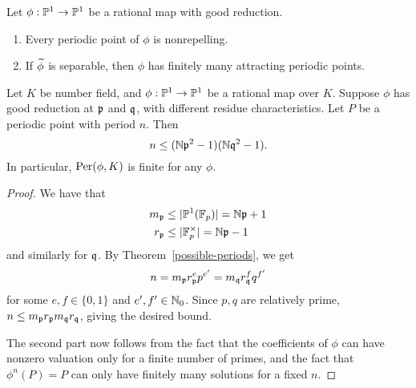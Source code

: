 \begin{cor}
Let $\phi:\mathbb{P}^1\to \mathbb{P}^1$ be a rational map with good reduction.
\begin{enumerate}
\item
Every periodic point of $\phi$ is nonrepelling.
\item
If $\widetilde{\phi}$ is separable, then $\phi$ has finitely many attracting periodic points.
\end{enumerate}
\end{cor}
\begin{thm}
Let $K$ be  number field, and $\phi:\mathbb{P}^1\to \mathbb{P}^1$ be a rational map over $K$. Suppose $\phi$ has good reduction at $\mathfrak{p}$ and $\mathfrak{q}$, with different residue characteristics. Let $P$ be a periodic point with period $n$. Then
\[
n\le (\mathbb{N}\mathfrak{p}^2-1)(\mathbb{N}\mathfrak{q}^2-1).
\]
In particular, $\operatorname{Per}(\phi,K)$ is finite for any $\phi$. %
\end{thm}
\begin{proof}
We have that 
\begin{align*}
m_{\mathfrak{p}}&\le |\mathbb{P}^1(\mathbb{F}_p)|=\mathbb{N}\mathfrak{p}+1\\
r_{\mathfrak{p}}&\le |\mathbb{F}_p^{\times}|=\mathbb{N}\mathfrak{p}-1
\end{align*}
and similarly for $\mathfrak{q}$. By Theorem~\ref{possible-periods}, we get
\[
n=m_{\mathfrak{p}}r_{\mathfrak{p}}^{e}p^{e'}=m_{\mathfrak{q}}r_{\mathfrak{q}}^fq^{f'}
\]
for some $e,f\in \{0,1\}$ and $e',f'\in \mathbb{N}_0$. Since $p,q$ are relatively prime, $n\le  m_{\mathfrak{p}}r_{\mathfrak{p}}m_{\mathfrak{q}}r_{\mathfrak{q}}$, giving the desired bound.

The second part now follows from the fact that the coefficients of $\phi$ can have nonzero valuation only for a finite number of primes, and the fact that $\phi^n(P)=P$ can only have finitely many solutions for a fixed $n$.
\end{proof}
